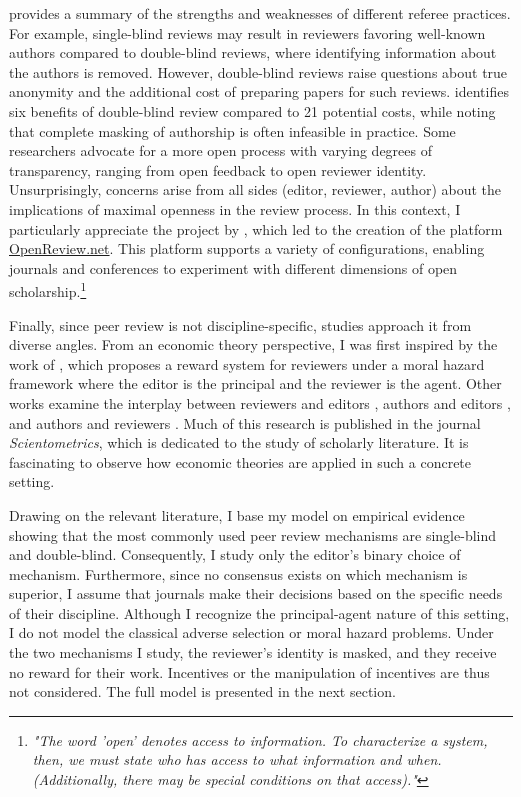 \documentclass[12pt]{article}
\begin{document}
\citet{tan2018peer} provides a summary of the strengths and weaknesses of different referee practices. For example, single-blind reviews may result in reviewers favoring well-known authors compared to double-blind reviews, where identifying information about the authors is removed. However, double-blind reviews raise questions about true anonymity and the additional cost of preparing papers for such reviews. \citet{snodgrass2007single} identifies six benefits of double-blind review compared to 21 potential costs, while noting that complete masking of authorship is often infeasible in practice. Some researchers advocate for a more open process with varying degrees of transparency, ranging from open feedback to open reviewer identity. Unsurprisingly, concerns arise from all sides (editor, reviewer, author) about the implications of maximal openness in the review process. In this context, I particularly appreciate the project by \citet{soergel2013open}, which led to the creation of the platform \href{https://openreview.net/}{OpenReview.net}. This platform supports a variety of configurations, enabling journals and conferences to experiment with different dimensions of open scholarship.\footnote{\textit{"The word 'open' denotes access to information. To characterize a system, then, we must state who has access to what information and when. (Additionally, there may be special conditions on that access)."}}

Finally, since peer review is not discipline-specific, studies approach it from
diverse angles. From an economic theory perspective, I was first inspired by
the work of \citet{garcia2015principal}, which proposes a reward system for
reviewers under a moral hazard framework where the editor is the principal and
the reviewer is the agent. Other works examine the interplay between reviewers
and editors \citep{garcia2021interplay}, authors and editors
\citep{garcia2022fraud}, and authors and reviewers
\citep{radzvilas2023incentives}. Much of this research is published in the
journal \textit{Scientometrics}, which is dedicated to the study of scholarly
literature. It is fascinating to observe how economic theories are applied in
such a concrete setting.

Drawing on the relevant literature, I base my model on empirical evidence
showing that the most commonly used peer review mechanisms are single-blind and
double-blind. Consequently, I study only the editor's binary choice of
mechanism. Furthermore, since no consensus exists on which mechanism is
superior, I assume that journals make their decisions based on the specific
needs of their discipline. Although I recognize the principal-agent nature of
this setting, I do not model the classical adverse selection or moral hazard
problems. Under the two mechanisms I study, the reviewer's identity is masked,
and they receive no reward for their work. Incentives or the manipulation of
incentives are thus not considered. The full model is presented in the next
section.
\end{document}
